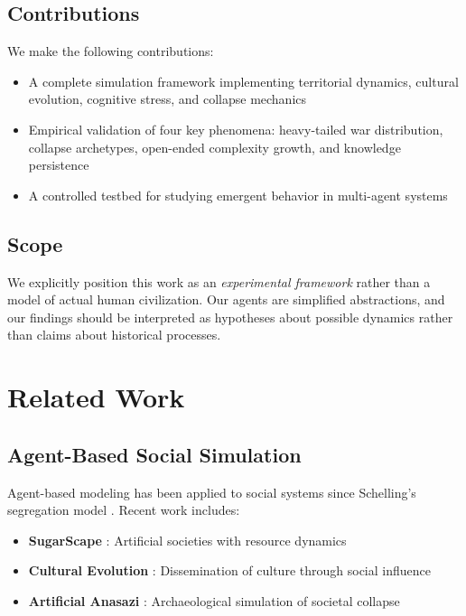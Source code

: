 \documentclass[11pt,a4paper]{article}
\begin{document}
\subsection{Contributions}

We make the following contributions:

\begin{itemize}
    \item A complete simulation framework implementing territorial dynamics, cultural evolution, cognitive stress, and collapse mechanics
    \item Empirical validation of four key phenomena: heavy-tailed war distribution, collapse archetypes, open-ended complexity growth, and knowledge persistence
    \item A controlled testbed for studying emergent behavior in multi-agent systems
\end{itemize}

\subsection{Scope}

We explicitly position this work as an \textit{experimental framework} rather than a model of actual human civilization. Our agents are simplified abstractions, and our findings should be interpreted as hypotheses about possible dynamics rather than claims about historical processes.

\section{Related Work}

\subsection{Agent-Based Social Simulation}

Agent-based modeling has been applied to social systems since Schelling's segregation model \cite{schelling1971}. Recent work includes:

\begin{itemize}
    \item \textbf{SugarScape} \cite{epstein1996}: Artificial societies with resource dynamics
    \item \textbf{Cultural Evolution} \cite{axelrod1997}: Dissemination of culture through social influence
    \item \textbf{Artificial Anasazi} \cite{axtell2002}: Archaeological simulation of societal collapse
\end{itemize}
\end{document}
